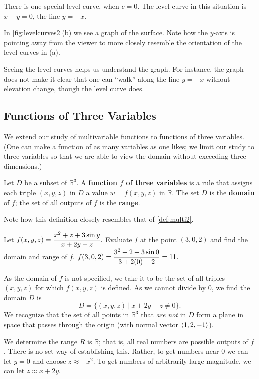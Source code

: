 \begin{example}
There is one special level curve, when $c=0$. The level curve in this situation is $x+y=0$, the line $y=-x$.

In \autoref{fig:levelcurves2}(b) we see a graph of the surface. Note how the $y$-axis is pointing away from the viewer to more closely resemble the orientation of the level curves in (a). 

Seeing the level curves helps us understand the graph. For instance, the graph does not make it clear that one can ``walk'' along the line $y=-x$ without elevation change, though the level curve does.
\end{example}

\subsection{Functions of Three Variables}

We extend our study of multivariable functions to functions of three variables. (One can make a function of as many variables as one likes; we limit our study to three variables so that we are able to view the domain without exceeding three dimensions.)

\begin{definition}\label{def:multi3}%
Let $D$ be a subset of $\mathbb{R}^3$. A \textbf{function $f$ of three variables} is a rule that assigns each triple $(x,y,z)$ in $D$ a value $w=f(x,y,z)$ in $\mathbb{R}$. The set $D$ is the \textbf{domain} of $f$; the set of all outputs of $f$ is the \textbf{range}.
\end{definition}

Note how this definition closely resembles that of \autoref{def:multi2}.

\begin{example}\label{ex_multi3}%
Let $\displaystyle f(x,y,z) =  \frac{x^2+z+3\sin y}{x+2y-z}.$ Evaluate $f$ at the point $(3,0,2)$ and find the domain and range of $f$.
\solution
$\displaystyle f(3,0,2) = \frac{3^2+2+3\sin 0}{3+2(0)-2} = 11.$

As the domain of $f$ is not specified, we take it to be the set of all triples $(x,y,z)$ for which $f(x,y,z)$ is defined. As we cannot divide by $0$, we find the domain $D$ is 
\[D = \{(x,y,z)\ |\ x+2y-z\neq 0\}.\]
We recognize that the set of all points in $\mathbb{R}^3$ that \emph{are not} in $D$ form a plane in space that passes through the origin (with normal vector $\left\langle 1,2,-1\right\rangle$). 

We determine the range $R$ is $\mathbb{R}$; that is, all real numbers are possible outputs of $f$. There is no set way of establishing this. Rather, to get numbers near 0 we can let $y=0$ and choose $z \approx -x^2$. To get numbers of arbitrarily large magnitude, we can let $z\approx x+2y$.
\end{example}


